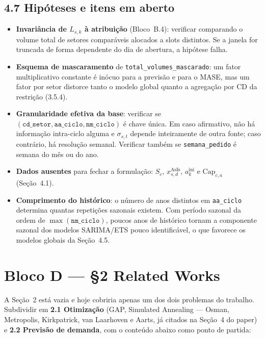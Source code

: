 \documentclass[11pt]{article}
\begin{document}
\subsection*{4.7 Hipóteses e itens em aberto}

\begin{itemize}
  \item \textbf{Invariância de $L_{s,k}$ à atribuição} (Bloco~B.4):
    verificar comparando o volume total de setores comparáveis alocados a
    slots distintos. Se a janela for truncada de forma dependente do dia
    de abertura, a hipótese falha.
  \item \textbf{Esquema de mascaramento} de
    \texttt{total\_volumes\_mascarado}: um fator multiplicativo constante
    é inócuo para a previsão e para o MASE, mas um fator por setor
    distorce tanto o modelo global quanto a agregação por CD da
    restrição (3.5.4).
  \item \textbf{Granularidade efetiva da base}: verificar se
    $(\texttt{cd\_setor}, \texttt{aa\_ciclo}, \texttt{nm\_ciclo})$ é chave
    única. Em caso afirmativo, não há informação intra-ciclo alguma e
    $\sigma_{s,t}$ depende inteiramente de outra fonte; caso contrário, há
    resolução semanal. Verificar também se \texttt{semana\_pedido} é
    semana do mês ou do ano.
  \item \textbf{Dados ausentes} para fechar a formulação: $S_c$,
    $x^{\mathrm{AsIs}}_{s,d}$, $a^{\mathrm{ini}}_k$ e $\mathrm{Cap}_{c,a}$
    (Seção~4.1).
  \item \textbf{Comprimento do histórico}: o número de anos distintos em
    \texttt{aa\_ciclo} determina quantas repetições sazonais existem. Com
    período sazonal da ordem de $\max(\texttt{nm\_ciclo})$, poucos anos de
    histórico tornam a componente sazonal dos modelos SARIMA/ETS pouco
    identificável, o que favorece os modelos globais da Seção~4.5.
\end{itemize}

\section*{Bloco D — §2 Related Works}

A Seção~2 está vazia e hoje cobriria apenas um dos dois problemas do
trabalho. Subdividir em \textbf{2.1 Otimização} (GAP, Simulated Annealing
--- Osman, Metropolis, Kirkpatrick, van Laarhoven e Aarts, já citados na
Seção~4 do paper) e \textbf{2.2 Previsão de demanda}, com o conteúdo
abaixo como ponto de partida:
\end{document}
